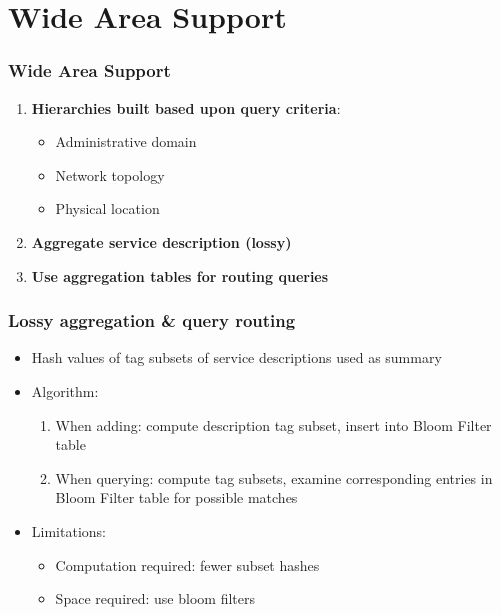 \documentclass{beamer}
\begin{document}
\section{Wide Area Support}
\begin{frame}
\frametitle{Wide Area Support}
\begin{enumerate}[<+->]
\item {\bf Hierarchies built based upon query criteria}: \\
\begin{itemize}
\item Administrative domain
\item Network topology
\item Physical location
\end{itemize}
\item {\bf Aggregate service description (lossy)}
\item {\bf Use aggregation tables for routing queries}
\end{enumerate}
\end{frame}
\begin{frame}
\frametitle{Lossy aggregation \& query routing}
\begin{itemize}
\item Hash values of tag subsets of service descriptions used as summary
\item Algorithm:
\begin{enumerate}
\item When adding: compute description tag subset, insert into Bloom Filter table
\item When querying: compute tag subsets, examine corresponding entries in Bloom Filter table for possible matches
\end{enumerate}
\item Limitations:
\begin{itemize}
\item Computation required: fewer subset hashes
\item Space required: use bloom filters
\end{itemize}
\end{itemize}
\end{frame}

\end{document}
